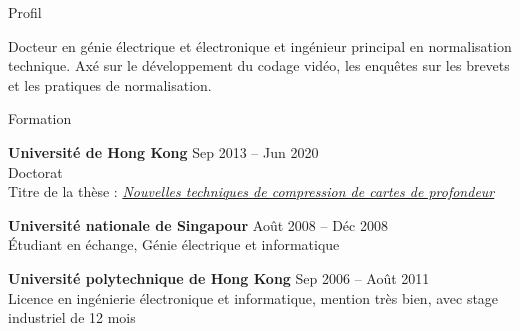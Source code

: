 \documentclass{resume} %
\begin{document}

\begin{rSection}{Profil}

Docteur en génie électrique et électronique et ingénieur principal en normalisation technique. Axé sur le développement du codage vidéo, les enquêtes sur les brevets et les pratiques de normalisation.

\end{rSection}


\begin{rSection}{Formation}

{\bf Université de Hong Kong} \hfill {Sep 2013 -- Jun 2020} \\ 
Doctorat \\
Titre de la thèse : \href{http://hdl.handle.net/10722/318421}{\textit{Nouvelles techniques de compression de cartes de profondeur}}

{\bf Université nationale de Singapour} \hfill {Août 2008 -- Déc 2008} \\ 
Étudiant en échange, Génie électrique et informatique

{\bf Université polytechnique de Hong Kong} \hfill {Sep 2006 -- Août 2011} \\ 
Licence en ingénierie électronique et informatique, mention très bien, avec stage industriel de 12 mois

\end{rSection}

\end{document}
